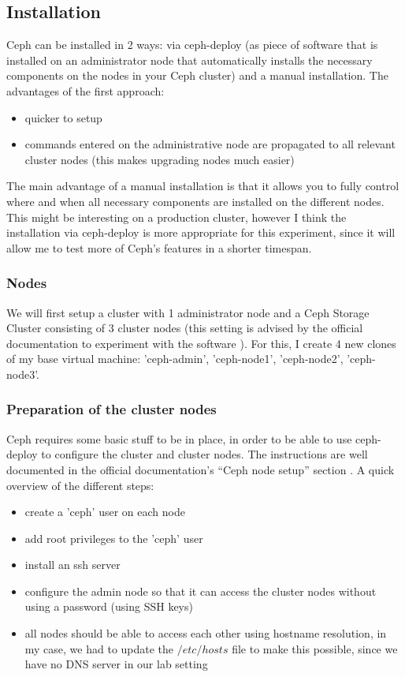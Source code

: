 \documentclass[12pt]{report}
\begin{document}
\subsection{Installation}
Ceph can be installed in 2 ways: via ceph-deploy (as piece of software
that is installed on an administrator node that automatically installs the
necessary components on the nodes in your Ceph cluster) and a
manual installation.
The advantages of the first approach:
\begin{itemize}
\item quicker to setup
\item commands entered on the administrative node are 
  propagated to all relevant cluster nodes (this makes upgrading nodes
  much easier)
\end{itemize}
The main advantage of a manual installation is that it allows you to
fully control where and when all necessary components are installed on the different
nodes. 
This might be interesting on a production cluster, however I think the
installation via ceph-deploy is more appropriate for this experiment, since it will
allow me to test more of Ceph's features in a shorter timespan.

\subsubsection{Nodes}
We will first setup a cluster with 1 administrator node and a Ceph
Storage Cluster consisting of 3 cluster nodes (this setting is advised
by the official documentation to experiment with the software \cite{ceph_official_doc}).
For this, I create 4 new clones of my base virtual machine:
'ceph-admin', 'ceph-node1', 'ceph-node2', 'ceph-node3'.

\subsubsection{Preparation of the cluster nodes}
Ceph requires some basic stuff to be in place, in order to be able to
use ceph-deploy to configure the cluster and cluster nodes.
The instructions are well documented in the official documentation's
``Ceph node setup'' section \cite{ceph_official_doc}.
A quick overview of the different steps:
\begin{itemize}
\item create a 'ceph' user on each node
\item add root privileges to the 'ceph' user
\item install an ssh server
\item configure the admin node so that it can access the cluster nodes
  without using a password (using SSH keys)
\item all nodes should be able to access each other using hostname
  resolution, in my case, we had to update the $/etc/hosts$ file to
  make this possible, since we have no DNS server in our lab setting
\end{itemize}
\end{document}
